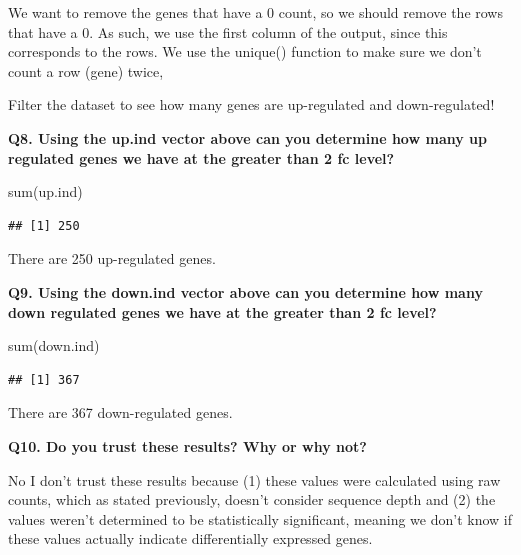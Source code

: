 \documentclass[
]{article}
\newenvironment{Shaded}{\begin{snugshade}}{\end{snugshade}}
\newcommand{\DecValTok}[1]{\textcolor[rgb]{0.00,0.00,0.81}{#1}}
\newcommand{\FunctionTok}[1]{\textcolor[rgb]{0.00,0.00,0.00}{#1}}
\newcommand{\NormalTok}[1]{#1}
\newcommand{\OtherTok}[1]{\textcolor[rgb]{0.56,0.35,0.01}{#1}}
\newcommand{\SpecialCharTok}[1]{\textcolor[rgb]{0.00,0.00,0.00}{#1}}
\begin{document}
We want to remove the genes that have a 0 count, so we should remove the
rows that have a 0. As such, we use the first column of the output,
since this corresponds to the rows. We use the unique() function to make
sure we don't count a row (gene) twice,

Filter the dataset to see how many genes are up-regulated and
down-regulated!

\begin{Shaded}
\end{Shaded}

\textbf{Q8. Using the up.ind vector above can you determine how many up
regulated genes we have at the greater than 2 fc level?}

\begin{Shaded}
\begin{Highlighting}[]
\FunctionTok{sum}\NormalTok{(up.ind)}
\end{Highlighting}
\end{Shaded}

\begin{verbatim}
## [1] 250
\end{verbatim}

There are 250 up-regulated genes.

\textbf{Q9. Using the down.ind vector above can you determine how many
down regulated genes we have at the greater than 2 fc level?}

\begin{Shaded}
\begin{Highlighting}[]
\FunctionTok{sum}\NormalTok{(down.ind)}
\end{Highlighting}
\end{Shaded}

\begin{verbatim}
## [1] 367
\end{verbatim}

There are 367 down-regulated genes.

\textbf{Q10. Do you trust these results? Why or why not?}

No I don't trust these results because (1) these values were calculated
using raw counts, which as stated previously, doesn't consider sequence
depth and (2) the values weren't determined to be statistically
significant, meaning we don't know if these values actually indicate
differentially expressed genes.
\end{document}
